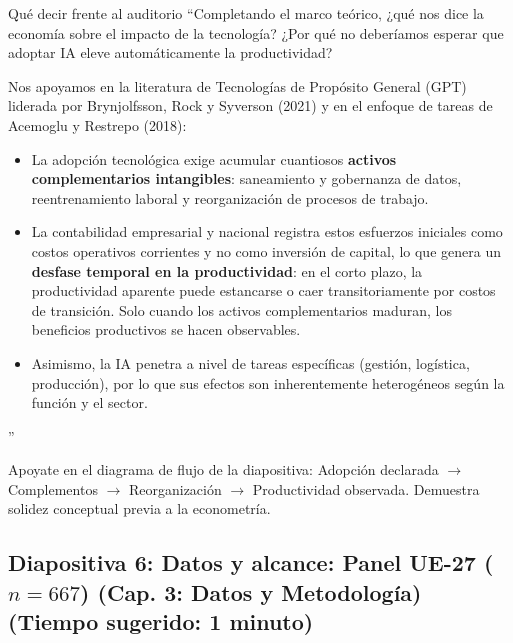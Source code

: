 \documentclass[11pt,a4paper]{article}
\begin{document}
\begin{speechbox}{Qué decir frente al auditorio}
``Completando el marco teórico, ¿qué nos dice la economía sobre el impacto de la tecnología? ¿Por qué no deberíamos esperar que adoptar IA eleve automáticamente la productividad?

Nos apoyamos en la literatura de Tecnologías de Propósito General (GPT) liderada por Brynjolfsson, Rock y Syverson (2021) y en el enfoque de tareas de Acemoglu y Restrepo (2018):
\begin{itemize}[itemsep=0.15em]
  \item La adopción tecnológica exige acumular cuantiosos \textbf{activos complementarios intangibles}: saneamiento y gobernanza de datos, reentrenamiento laboral y reorganización de procesos de trabajo.
  \item La contabilidad empresarial y nacional registra estos esfuerzos iniciales como costos operativos corrientes y no como inversión de capital, lo que genera un \textbf{desfase temporal en la productividad}: en el corto plazo, la productividad aparente puede estancarse o caer transitoriamente por costos de transición. Solo cuando los activos complementarios maduran, los beneficios productivos se hacen observables.
  \item Asimismo, la IA penetra a nivel de tareas específicas (gestión, logística, producción), por lo que sus efectos son inherentemente heterogéneos según la función y el sector.
\end{itemize}''
\end{speechbox}

\begin{tipbox}
Apoyate en el diagrama de flujo de la diapositiva: Adopción declarada $\rightarrow$ Complementos $\rightarrow$ Reorganización $\rightarrow$ Productividad observada. Demuestra solidez conceptual previa a la econometría.
\end{tipbox}

\subsection*{Diapositiva 6: Datos y alcance: Panel UE-27 ($n=667$) (Cap. 3: Datos y Metodología) (Tiempo sugerido: 1 minuto)}
\end{document}
